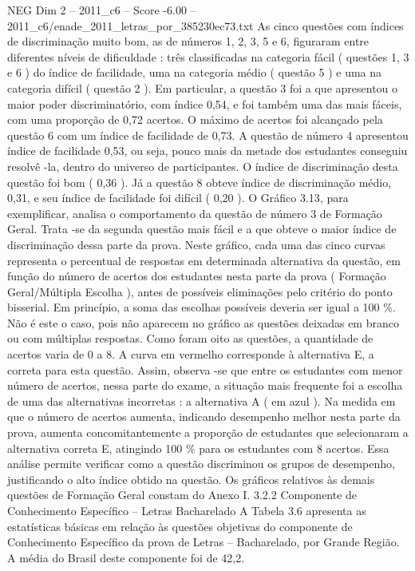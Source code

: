 \begin{textsample}{NEG Dim 2 – 2011\_c6 – Score -6.00 – 2011\_c6/enade\_2011\_letras\_por\_385230ec73.txt}
As cinco questões com índices de discriminação muito bom, as de números 1, 2, 3, 5 e 6, figuraram entre diferentes níveis de dificuldade : três classificadas na categoria fácil ( questões 1, 3 e 6 ) do índice de facilidade, uma na categoria médio ( questão 5 ) e uma na categoria difícil ( questão 2 ).
Em particular, a questão 3 foi a que apresentou o maior poder discriminatório, com índice 0,54, e foi também uma das mais fáceis, com uma proporção de 0,72 acertos.
O máximo de acertos foi alcançado pela questão 6 com um índice de facilidade de 0,73.
A questão de número 4 apresentou índice de facilidade 0,53, ou seja, pouco mais da metade dos estudantes conseguiu resolvê -la, dentro do universo de participantes.
O índice de discriminação desta questão foi bom ( 0,36 ).
Já a questão 8 obteve índice de discriminação médio, 0,31, e seu índice de facilidade foi difícil ( 0,20 ).
O Gráfico 3.13, para exemplificar, analisa o comportamento da questão de número 3 de Formação Geral.
Trata -se da segunda questão mais fácil e a que obteve o maior índice de discriminação dessa parte da prova.
Neste gráfico, cada uma das cinco curvas representa o percentual de respostas em determinada alternativa da questão, em função do número de acertos dos estudantes nesta parte da prova ( Formação Geral/Múltipla Escolha ), antes de possíveis eliminações pelo critério do ponto bisserial.
Em princípio, a soma das escolhas possíveis deveria ser igual a 100 \%.
Não é este o caso, pois não aparecem no gráfico as questões deixadas em branco ou com múltiplas respostas.
Como foram oito as questões, a quantidade de acertos varia de 0 a 8.
A curva em vermelho corresponde à alternativa E, a correta para esta questão.
Assim, observa -se que entre os estudantes com menor número de acertos, nessa parte do exame, a situação mais frequente foi a escolha de uma das alternativas incorretas : a alternativa A ( em azul ).
Na medida em que o número de acertos aumenta, indicando desempenho melhor nesta parte da prova, aumenta concomitantemente a proporção de estudantes que selecionaram a alternativa correta E, atingindo 100 \% para os estudantes com 8 acertos.
Essa análise permite verificar como a questão discriminou os grupos de desempenho, justificando o alto índice obtido na questão.
Os gráficos relativos às demais questões de Formação Geral constam do Anexo I. 3.2.2 Componente de Conhecimento Específico – Letras Bacharelado A Tabela 3.6 apresenta as estatísticas básicas em relação às questões objetivas do componente de Conhecimento Específico da prova de Letras – Bacharelado, por Grande Região.
A média do Brasil deste componente foi de 42,2.

\end{textsample}
